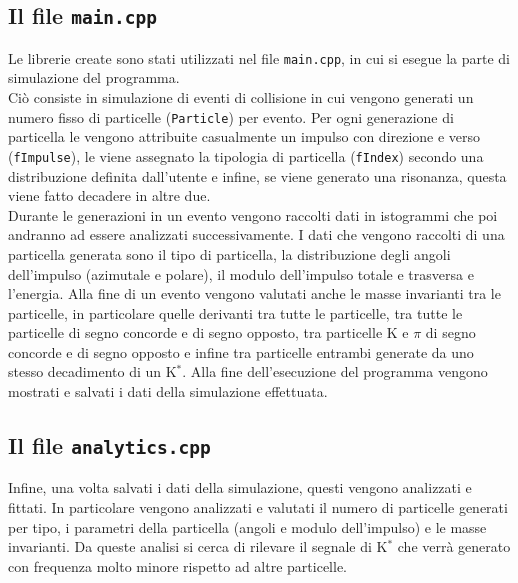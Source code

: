\subsection*{Il file \texttt{main.cpp}}

Le librerie create sono stati utilizzati nel file \verb|main.cpp|, in cui si esegue la parte di simulazione del programma.\\
Ciò consiste in simulazione di eventi di collisione in cui vengono generati un numero fisso di particelle (\verb|Particle|) per evento. Per ogni generazione di  particella le vengono attribuite casualmente un impulso con direzione e verso (\verb|fImpulse|), le viene assegnato la tipologia di particella (\verb|fIndex|) secondo una distribuzione definita dall'utente e infine, se viene generato una risonanza, questa viene fatto decadere in altre due.\\
Durante le generazioni in un evento vengono raccolti dati in istogrammi che poi andranno ad essere analizzati successivamente. I dati che vengono raccolti di una particella generata sono il tipo di particella, la distribuzione degli angoli dell'impulso (azimutale e polare), il modulo dell'impulso totale e trasversa e l'energia. Alla fine di un evento vengono valutati anche le masse invarianti tra le particelle, in particolare quelle derivanti tra tutte le particelle, tra tutte le particelle di segno concorde e di segno opposto, tra particelle K e $\pi$ di segno concorde  e di segno opposto e infine tra particelle entrambi generate da uno stesso decadimento di un K$^*$. 
Alla fine dell'esecuzione del programma vengono mostrati e salvati i dati della simulazione effettuata.\\

\subsection*{Il file \texttt{analytics.cpp}}
Infine, una volta salvati i dati della simulazione, questi vengono analizzati e fittati.
In particolare vengono analizzati e valutati il numero di particelle generati per tipo, i parametri della particella (angoli e modulo dell'impulso) e le masse invarianti. Da queste analisi si cerca di rilevare il segnale di K$^*$ che verrà generato con frequenza molto minore rispetto ad altre particelle.\\